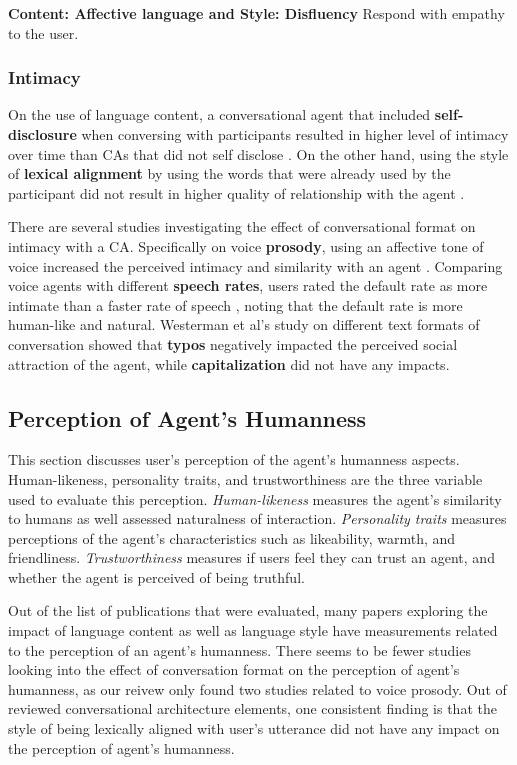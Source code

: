 \documentclass[sigconf,screen,review, anonymous]{acmart}
\newcommand{\cmt}[1]{}%
\begin{document}
\textbf{Content: Affective language and Style: Disfluency}
Respond with empathy to the user. \cite{hu2021enhancing}\cmt{[56]}

\subsubsection{Intimacy}
On the use of language content, a conversational agent that included \textbf{self-disclosure} when conversing with participants resulted in higher level of intimacy over time than CAs that did not self disclose \cite{lee2020hear}\cmt{[23]}. On the other hand, using the style of \textbf{lexical alignment} by using the words that were already used by the participant did not result in higher quality of relationship with the agent \cite{linnemann2018can}\cmt{[15]}.

There are several studies investigating the effect of conversational format on intimacy with a CA. Specifically on voice \textbf{prosody}, using an affective tone of voice increased the perceived intimacy and similarity with an agent \cite{kim2020can}\cmt{[24]}. Comparing voice agents with different \textbf{speech rates}, users rated the default rate as more intimate than a faster rate of speech \cite{choi2020nobody}\cmt{[54]}, noting that the default rate is more human-like and natural. Westerman et al's study on different text formats of conversation \cite{westerman2019believe}\cmt{[9]} showed that \textbf{typos} negatively impacted the perceived social attraction of the agent, while \textbf{capitalization} did not have any impacts.

\subsection{Perception of Agent's Humanness}

This section discusses user's perception of the agent's humanness aspects. Human-likeness, personality traits, and trustworthiness are the three variable used to evaluate this perception. \textit{Human-likeness} measures the agent's similarity to humans as well assessed naturalness of interaction. \textit{Personality traits} measures perceptions of the agent's characteristics such as likeability, warmth, and friendliness. \textit{Trustworthiness} measures if users feel they can trust an agent, and whether the agent is perceived of being truthful.

Out of the list of publications that were evaluated, many papers exploring the impact of language content as well as language style have measurements related to the perception of an agent's humanness. There seems to be fewer studies looking into the effect of conversation format on the perception of agent's humanness, as our reivew only found two studies related to voice prosody. Out of reviewed conversational architecture elements, one consistent finding is that the style of being lexically aligned with user's utterance did not have any impact on the perception of agent's humanness.
\end{document}
